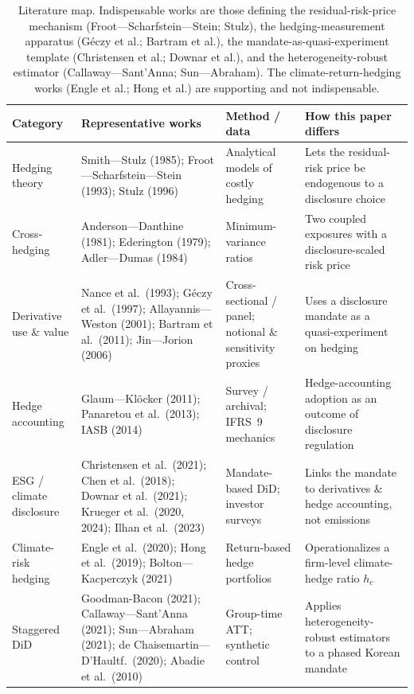 \documentclass[11pt,a4paper]{article}
\begin{document}
\begin{table}[h]
\centering
\begin{tabular}{p{3.0cm} p{4.4cm} p{3.0cm} p{3.6cm}}
\toprule
Category & Representative works & Method / data & How this paper differs \\
\midrule
Hedging theory & Smith---Stulz (1985); Froot---Scharfstein---Stein (1993); Stulz (1996) & Analytical models of costly hedging & Lets the residual-risk price be endogenous to a disclosure choice \\
Cross-hedging & Anderson---Danthine (1981); Ederington (1979); Adler---Dumas (1984) & Minimum-variance ratios & Two coupled exposures with a disclosure-scaled risk price \\
Derivative use \& value & Nance et al.\ (1993); G\'eczy et al.\ (1997); Allayannis---Weston (2001); Bartram et al.\ (2011); Jin---Jorion (2006) & Cross-sectional / panel; notional \& sensitivity proxies & Uses a disclosure mandate as a quasi-experiment on hedging \\
Hedge accounting & Glaum---Kl\"ocker (2011); Panaretou et al.\ (2013); IASB (2014) & Survey / archival; IFRS~9 mechanics & Hedge-accounting adoption as an outcome of disclosure regulation \\
ESG / climate disclosure & Christensen et al.\ (2021); Chen et al.\ (2018); Downar et al.\ (2021); Krueger et al.\ (2020, 2024); Ilhan et al.\ (2023) & Mandate-based DiD; investor surveys & Links the mandate to derivatives \& hedge accounting, not emissions \\
Climate-risk hedging & Engle et al.\ (2020); Hong et al.\ (2019); Bolton---Kacperczyk (2021) & Return-based hedge portfolios & Operationalizes a firm-level climate-hedge ratio $h_c$ \\
Staggered DiD & Goodman-Bacon (2021); Callaway---Sant'Anna (2021); Sun---Abraham (2021); de Chaisemartin---D'Haultf.\ (2020); Abadie et al.\ (2010) & Group-time ATT; synthetic control & Applies heterogeneity-robust estimators to a phased Korean mandate \\
\bottomrule
\end{tabular}
\caption{Literature map. Indispensable works are those defining the residual-risk-price mechanism (Froot---Scharfstein---Stein; Stulz), the hedging-measurement apparatus (G\'eczy et al.; Bartram et al.), the mandate-as-quasi-experiment template (Christensen et al.; Downar et al.), and the heterogeneity-robust estimator (Callaway---Sant'Anna; Sun---Abraham). The climate-return-hedging works (Engle et al.; Hong et al.) are supporting and not indispensable.}
\label{tab:litmap}
\end{table}
\end{document}

